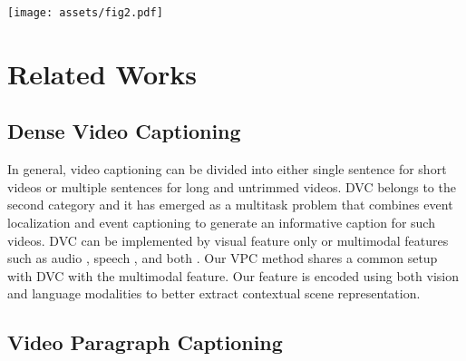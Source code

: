 \documentclass[letterpaper]{article} \usepackage{aaai23}  \usepackage{times}  \usepackage{helvet}  \usepackage{courier}  \usepackage[hyphens]{url}  \usepackage{graphicx} \urlstyle{rm} \def\UrlFont{\rm}  \usepackage{natbib}  \usepackage{caption} \frenchspacing  \setlength{\pdfpagewidth}{8.5in}  \setlength{\pdfpageheight}{11in}  \usepackage{algorithm}
\newcommand{\encoder}{VL Encoder\xspace}
\begin{document}
\begin{figure*}[!t]
  \centering
  \texttt{[image: assets/fig2.pdf]}
\caption{Overall network architecture of our proposed \model, which contains two modules, i.e., \encoder and TinT Decoder. (Left) \encoder: given a snippet , the \encoder simultaneously extracts local visual features from main agents, global visual features from the environment, and linguistic relevant scene elements; and models interaction between those three modalities through our M2RF module. (Right) TinT Decoder: the canonical transformer encoder is extended by an autoregressive outer transformer that can selectively access the  to  hidden states, which are stored in the event memory, at the  event captioning step.}
\label{fig:overall}
\vspace{-4mm}
\end{figure*}

\section{Related Works}



\subsection{Dense Video Captioning} 
In general, video captioning can be divided into either single sentence \cite{pasunuru2017multi, wang2019vatex} for short videos or multiple sentences \cite{wang2020event} for long and untrimmed videos. DVC belongs to the second category and it has emerged as a multitask problem that combines event localization and event captioning to generate an informative caption for such videos. DVC can be implemented by visual feature only \cite{krishna2017dense, li2018jointly, zhou2018end, mun2019streamlined, deng2021sketch} or multimodal features such as audio \cite{rahman2019watch}, speech \cite{shi2019dense, iashin2020multi}, and both \cite{iashin2020multi}. Our VPC method shares a common setup with DVC with the multimodal feature. Our feature is encoded using both vision and language modalities to better extract contextual scene representation.

\subsection{Video Paragraph Captioning} 
\end{document}
